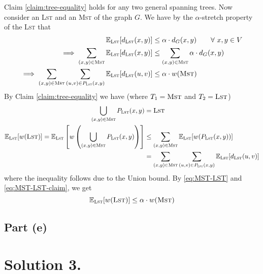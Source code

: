 \documentclass[9pt]{article}
\begin{document}
Claim \ref{claim:tree-equality} holds for any two general spanning trees. Now consider an
\textsc{Lst} and an \textsc{Mst} of the graph $G$. We have by the $\alpha$-stretch property
of the \textsc{Lst} that
\begin{align}
    \label{eq:MST-LST}
    \begin{split}
        \mathbb{E}_{\textsc{Lst}}[d_{\textsc{Lst}}(x, y)] &\leq \alpha \cdot d_{G}(x, y) \qquad \forall \ x, y \in V \\
        \implies \sum_{(x, y) \in \textsc{Mst}} \mathbb{E}_{\textsc{Lst}}[d_{\textsc{Lst}}(x, y)] &\leq \sum_{(x, y) \in \textsc{Mst}} \alpha \cdot d_{G}(x, y) \\
        \implies \sum_{(x, y) \in \textsc{Mst}} \sum_{(u, v) \in P_{\textsc{Lst}}(x, y)} \mathbb{E}_{\textsc{Lst}}[d_{\textsc{Lst}}(u, v)] &\leq \alpha \cdot w(\textsc{Mst})
    \end{split}
\end{align}
By Claim \ref{claim:tree-equality} we have (where $T_{1} = \textsc{Mst}$ and
$T_{2} = \textsc{Lst}$)
\begin{align}
    \label{eq:MST-LST-claim}
    \begin{split}
        \bigcup_{(x, y) \in \textsc{Mst}} P_{\textsc{Lst}}(x, y) &= \textsc{Lst} \\
        \mathbb{E}_{\textsc{Lst}}[w(\textsc{Lst})] = \mathbb{E}_{\textsc{Lst}}\left[ w \left( \bigcup_{(x, y) \in \textsc{Mst}} P_{\textsc{Lst}}(x, y) \right) \right]
        &\leq \sum_{(x, y) \in \textsc{Mst}} \mathbb{E}_{\textsc{Lst}}[ w(P_{\textsc{Lst}}(x, y))] \\
        &= \sum_{(x, y) \in \textsc{Mst}} \sum_{(u, v) \in P_{\textsc{Lst}}(x, y)} \mathbb{E}_{\textsc{Lst}}[d_{\textsc{Lst}}(u, v)]
    \end{split}
\end{align}
where the inequality follows due to the Union bound. By \ref{eq:MST-LST} and
\ref{eq:MST-LST-claim}, we get
\begin{equation}
    \mathbb{E}_{\textsc{Lst}}[w(\textsc{Lst})] \leq \alpha \cdot w(\textsc{Mst})
\end{equation}

\subsection*{Part (e)}

\section*{Solution 3.}
\end{document}

